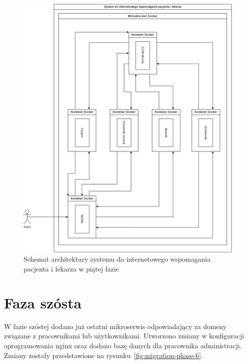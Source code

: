 \documentclass[12pt,oneside]{book}
\newcommand{\captionvspace}{\vspace{6pt}}
\begin{document}
    \begin{figure}[ht]
        \centering
        \includegraphics[width=\textwidth]{includes/images/migration-phase-5.png}
        \captionvspace
        \caption{Schemat architektury systemu do internetowego wspomagania pacjenta i lekarza w piątej fazie}
        \label{fig:migration-phase-5}
    \end{figure}


    \section{Faza szósta}
    W fazie szóstej dodano już ostatni mikroserwis odpowiadający za domeny związane z pracownikami lub użytkownikami. Utworzono zmiany w konfiguracji oprogramowania nginx oraz dodano bazę danych dla pracownika administracji. Zmiany zostały przedstawione na rysunku~\ref{fig:migration-phase-6}.
\end{document}
